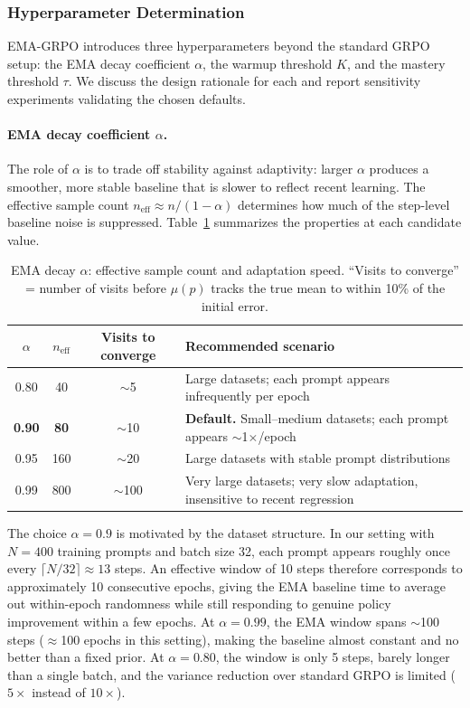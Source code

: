 \documentclass[11pt]{article}
\newcommand{\method}{EMA-GRPO}
\theoremstyle{definition}
\begin{document}
\subsubsection{Hyperparameter Determination}
\label{sec:hparam}

\method{} introduces three hyperparameters beyond the standard GRPO setup:
the EMA decay coefficient $\alpha$, the warmup threshold $K$, and the
mastery threshold $\tau$.
We discuss the design rationale for each and report sensitivity experiments
validating the chosen defaults.

\paragraph{EMA decay coefficient $\alpha$.}
The role of $\alpha$ is to trade off stability against adaptivity:
larger $\alpha$ produces a smoother, more stable baseline that is slower
to reflect recent learning.
The effective sample count $n_{\mathrm{eff}} \approx n/(1-\alpha)$
determines how much of the step-level baseline noise is suppressed.
Table~\ref{tab:alpha_tradeoff} summarizes the properties at each candidate
value.

\begin{table}[h]
\centering
\caption{EMA decay $\alpha$: effective sample count and adaptation speed.
  ``Visits to converge'' = number of visits before $\mu(p)$ tracks the
  true mean to within 10\% of the initial error.}
\label{tab:alpha_tradeoff}
\small
\begin{tabular}{cccp{6cm}}
\toprule
$\alpha$ & $n_{\mathrm{eff}}$ & Visits to converge & Recommended scenario \\
\midrule
0.80 &  40 & $\sim$5 & Large datasets; each prompt appears infrequently per epoch \\
\textbf{0.90} & \textbf{80} & $\sim$10 & \textbf{Default.} Small--medium datasets; each prompt appears $\sim$1$\times$/epoch \\
0.95 & 160 & $\sim$20 & Large datasets with stable prompt distributions \\
0.99 & 800 & $\sim$100 & Very large datasets; very slow adaptation, insensitive to recent regression \\
\bottomrule
\end{tabular}
\end{table}

The choice $\alpha=0.9$ is motivated by the dataset structure.
In our setting with $N=400$ training prompts and batch size 32, each prompt
appears roughly once every $\lceil N/32 \rceil \approx 13$ steps.
An effective window of 10 steps therefore corresponds to approximately
10 consecutive epochs, giving the EMA baseline time to average out
within-epoch randomness while still responding to genuine policy improvement
within a few epochs.
At $\alpha=0.99$, the EMA window spans $\sim$100 steps ($\approx$100 epochs
in this setting), making the baseline almost constant and no better than a
fixed prior.
At $\alpha=0.80$, the window is only 5 steps, barely longer than a single
batch, and the variance reduction over standard GRPO is limited
($5\times$ instead of $10\times$).
\end{document}
